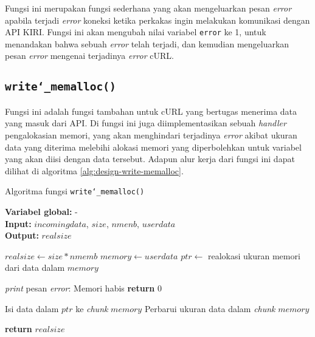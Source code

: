 Fungsi ini merupakan fungsi sederhana yang akan mengeluarkan pesan \textit{error} apabila terjadi \textit{error} koneksi ketika perkakas ingin melakukan komunikasi dengan API KIRI. Fungsi ini akan mengubah nilai variabel \verb|error| ke 1, untuk menandakan bahwa sebuah \textit{error} telah terjadi, dan kemudian mengeluarkan pesan \textit{error} mengenai terjadinya \textit{error} cURL.
	
\subsection{\texttt{write\char`_memalloc()}}
\label{sec:design-code-write-memalloc}

Fungsi ini adalah fungsi tambahan untuk cURL yang bertugas menerima data yang masuk dari API. Di fungsi ini juga diimplementasikan sebuah \textit{handler} pengalokasian memori, yang akan menghindari terjadinya \textit{error} akibat ukuran data yang diterima melebihi alokasi memori yang diperbolehkan untuk variabel yang akan diisi dengan data tersebut. Adapun alur kerja dari fungsi ini dapat dilihat di algoritma \ref{alg:design-write-memalloc}.

\begin{algorithm}[h]
	\caption{Algoritma fungsi \texttt{write\char`_memalloc()}}
	\label{alg:design-write-memalloc}
	\vspace{-0.6\baselineskip}
	\begin{flushleft}
		\textbf{Variabel global:} - \\
		\textbf{Input:} $incomingdata$, $size$, $nmenb$, $userdata$ \\
		\textbf{Output:} $realsize$ \\
	\end{flushleft}
	\vspace{-1.05\baselineskip}
	\begin{algorithmic}
		\State $realsize \gets size * nmemb$  
		\State $memory \gets userdata$ 
		\State $ptr \gets$ realokasi ukuran memori dari data dalam $memory$
		
		 
			\State \textit{print} pesan \textit{error}: Memori habis
			\State \textbf{return} $0$ 
		\EndIf
		
		\State Isi data dalam $ptr$ ke \textit{chunk} $memory$
		\State Perbarui ukuran data dalam \textit{chunk} $memory$
		
		\State \textbf{return} $realsize$ 
	\end{algorithmic}
\end{algorithm}

